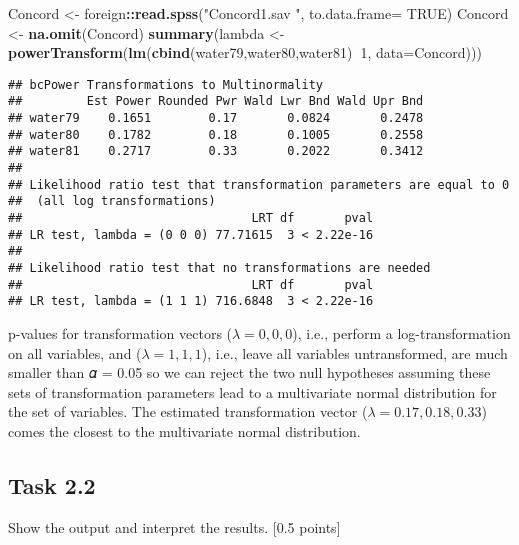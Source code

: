 \documentclass[
]{article}
\newenvironment{Shaded}{\begin{snugshade}}{\end{snugshade}}
\newcommand{\DataTypeTok}[1]{\textcolor[rgb]{0.13,0.29,0.53}{#1}}
\newcommand{\DecValTok}[1]{\textcolor[rgb]{0.00,0.00,0.81}{#1}}
\newcommand{\KeywordTok}[1]{\textcolor[rgb]{0.13,0.29,0.53}{\textbf{#1}}}
\newcommand{\NormalTok}[1]{#1}
\newcommand{\OperatorTok}[1]{\textcolor[rgb]{0.81,0.36,0.00}{\textbf{#1}}}
\newcommand{\OtherTok}[1]{\textcolor[rgb]{0.56,0.35,0.01}{#1}}
\newcommand{\StringTok}[1]{\textcolor[rgb]{0.31,0.60,0.02}{#1}}
\begin{document}
\begin{Shaded}
\begin{Highlighting}[]
\NormalTok{Concord <-}\StringTok{ }\NormalTok{foreign}\OperatorTok{::}\KeywordTok{read.spss}\NormalTok{(}\StringTok{"Concord1.sav "}\NormalTok{, }\DataTypeTok{to.data.frame=} \OtherTok{TRUE}\NormalTok{)}
\NormalTok{Concord <-}\StringTok{ }\KeywordTok{na.omit}\NormalTok{(Concord)}
\KeywordTok{summary}\NormalTok{(lambda <-}\StringTok{ }\KeywordTok{powerTransform}\NormalTok{(}\KeywordTok{lm}\NormalTok{(}\KeywordTok{cbind}\NormalTok{(water79,water80,water81)}\OperatorTok{~}\DecValTok{1}\NormalTok{, }\DataTypeTok{data=}\NormalTok{Concord)))}
\end{Highlighting}
\end{Shaded}

\begin{verbatim}
## bcPower Transformations to Multinormality 
##         Est Power Rounded Pwr Wald Lwr Bnd Wald Upr Bnd
## water79    0.1651        0.17       0.0824       0.2478
## water80    0.1782        0.18       0.1005       0.2558
## water81    0.2717        0.33       0.2022       0.3412
## 
## Likelihood ratio test that transformation parameters are equal to 0
##  (all log transformations)
##                                LRT df       pval
## LR test, lambda = (0 0 0) 77.71615  3 < 2.22e-16
## 
## Likelihood ratio test that no transformations are needed
##                                LRT df       pval
## LR test, lambda = (1 1 1) 716.6848  3 < 2.22e-16
\end{verbatim}

p-values for transformation vectors (\(\lambda = 0,0,0\)), i.e., perform
a log-transformation on all variables, and (\(\lambda = 1,1,1\)), i.e.,
leave all variables untransformed, are much smaller than 𝛼 = 0.05 so we
can reject the two null hypotheses assuming these sets of transformation
parameters lead to a multivariate normal distribution for the set of
variables. The estimated transformation vector
(\(\lambda = 0.17, 0.18, 0.33\)) comes the closest to the multivariate
normal distribution.

\hypertarget{task-2.2}{%
\subsection{Task 2.2}\label{task-2.2}}

Show the output and interpret the results. {[}0.5 points{]}
\end{document}

